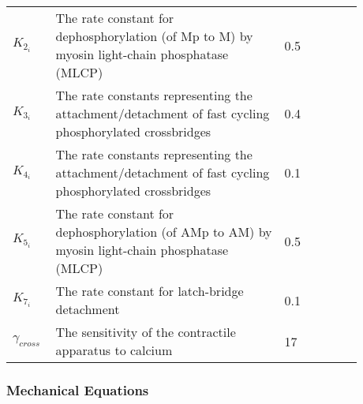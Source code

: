 \begin{table}[h!]
\centering
\begin{tabular}{| p{0.09\linewidth} | >{\footnotesize} p{0.6\linewidth} | >{\footnotesize} p{0.17\linewidth} | >{\footnotesize} p{0.02\linewidth} |}
\arrayrulecolor{lightgrey}\hline
$K_{2_{i}}$      	& The rate constant for dephosphorylation (of Mp to M) by myosin light-chain phosphatase (MLCP)																			 & 0.5 \pers & \cite{Hai1989} \\
$K_{3_{i}}$      	& The rate constants representing the attachment/detachment of fast cycling phosphorylated crossbridges																	 & 0.4 \pers	& \cite{Hai1989} \\
$K_{4_{i}}$      	& The rate constants representing the attachment/detachment of fast cycling phosphorylated crossbridges 																	 & 0.1 \pers	& \cite{Hai1989} \\
$K_{5_{i}}$      & The rate constant for dephosphorylation (of AMp to AM) by myosin light-chain phosphatase (MLCP)																			 & 0.5 \pers	& \cite{Hai1989} \\
$K_{7_{i}}$      	& The rate constant for latch-bridge detachment					& 0.1 \pers	& \cite{Hai1989} \\
$\gamma_{cross}$      	& The sensitivity of the contractile apparatus to calcium		& 17 \puMdries	& \cite{Hai1989} \\
\hline
\end{tabular}
\label{tab:crossbridge}
\end{table}
\newpage
\subsubsection{Mechanical Equations}

